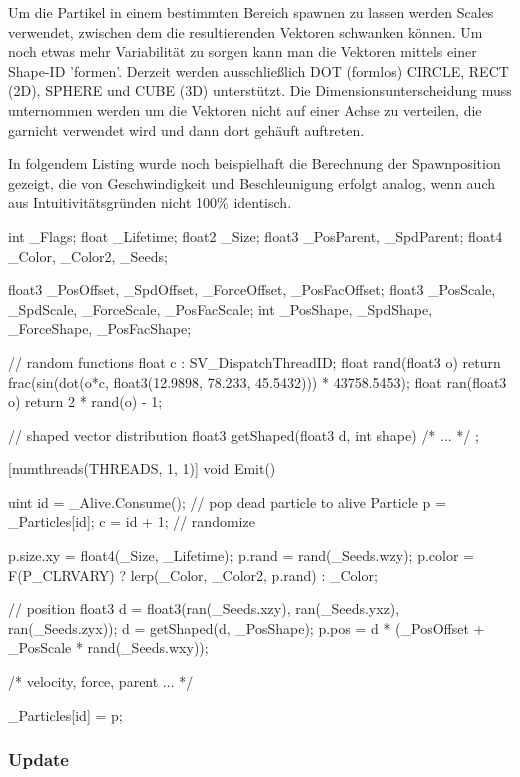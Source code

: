 Um die Partikel in einem bestimmten Bereich spawnen zu lassen werden Scales verwendet, zwischen dem die resultierenden Vektoren schwanken können. Um noch etwas mehr Variabilität zu sorgen kann man die Vektoren mittels einer Shape-ID 'formen'. Derzeit werden ausschlie{\ss}lich DOT (formlos) CIRCLE, RECT (2D), SPHERE und CUBE (3D) unterstützt. Die Dimensionsunterscheidung muss unternommen werden um die Vektoren nicht auf einer Achse zu verteilen, die garnicht verwendet wird und dann dort gehäuft auftreten.

In folgendem Listing wurde noch beispielhaft die Berechnung der Spawnposition gezeigt, die von Geschwindigkeit und Beschleunigung erfolgt analog, wenn auch aus Intuitivitätsgründen nicht 100\% identisch.

\begin{hlsl}[caption=Compute Emit Kernel]
int _Flags;
float _Lifetime;
float2 _Size;
float3 _PosParent, _SpdParent;
float4 _Color, _Color2, _Seeds;

float3 _PosOffset, _SpdOffset, _ForceOffset, _PosFacOffset;
float3 _PosScale, _SpdScale, _ForceScale, _PosFacScale;
int _PosShape, _SpdShape, _ForceShape, _PosFacShape;

// random functions
float c : SV_DispatchThreadID;
float rand(float3 o) {
    return frac(sin(dot(o*c, float3(12.9898, 78.233, 45.5432))) * 43758.5453);
}
float ran(float3 o) { return 2 * rand(o) - 1; }

// shaped vector distribution
float3 getShaped(float3 d, int shape) { /* ... */ };

[numthreads(THREADS, 1, 1)]
void Emit()
{
    uint id = _Alive.Consume(); // pop dead particle to alive
    Particle p = _Particles[id];
    c = id + 1; // randomize
    
    p.size.xy = float4(_Size, _Lifetime);
    p.rand = rand(_Seeds.wzy);
    p.color = F(P_CLRVARY) ? lerp(_Color, _Color2, p.rand) : _Color;
    
    // position
    float3 d = float3(ran(_Seeds.xzy), ran(_Seeds.yxz), ran(_Seeds.zyx));
    d = getShaped(d, _PosShape);
    p.pos = d * (_PosOffset + _PosScale * rand(_Seeds.wxy));
    
    /* velocity, force, parent ... */
    
    _Particles[id] = p;
}
\end{hlsl}


\subsubsection{Update}

